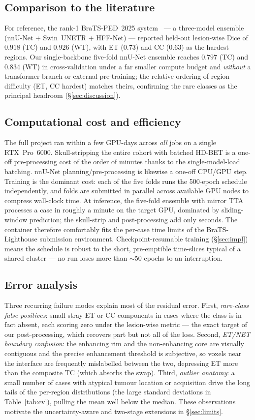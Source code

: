\documentclass[11pt,a4paper]{article}
\begin{document}
\subsection{Comparison to the literature}
For reference, the rank-1 BraTS-PED~2025 system~\cite{yi2025} --- a three-model
ensemble (nnU-Net + Swin~UNETR + HFF-Net) --- reported held-out lesion-wise Dice of
$0.918$ (TC) and $0.926$ (WT), with ET ($0.73$) and CC ($0.63$) as the hardest
regions. Our single-backbone five-fold nnU-Net ensemble reaches $0.797$ (TC) and
$0.834$ (WT) in cross-validation under a far smaller compute budget and \emph{without}
a transformer branch or external pre-training; the relative ordering of region
difficulty (ET, CC hardest) matches theirs, confirming the rare classes as the
principal headroom (\S\ref{sec:discussion}).

\subsection{Computational cost and efficiency}
The full project ran within a few GPU-days across \emph{all} jobs on a single
RTX~Pro~6000. Skull-stripping the entire cohort with batched HD-BET is a one-off
pre-processing cost of the order of minutes thanks to the single-model-load batching.
nnU-Net planning/pre-processing is likewise a one-off CPU/GPU step. Training is the
dominant cost: each of the five folds runs the 500-epoch schedule independently, and
folds are submitted in parallel across available GPU nodes to compress wall-clock
time. At inference, the five-fold ensemble with mirror TTA processes a case in
roughly a minute on the target GPU, dominated by sliding-window prediction; the
skull-strip and post-processing add only seconds. The container therefore comfortably
fits the per-case time limits of the BraTS-Lighthouse submission environment.
Checkpoint-resumable training (\S\ref{sec:impl}) means the schedule is robust to the
short, pre-emptible time-slices typical of a shared cluster --- no run loses more than
$\sim\!50$ epochs to an interruption.

\subsection{Error analysis}
Three recurring failure modes explain most of the residual error. First,
\emph{rare-class false positives}: small stray ET or CC components in cases where the
class is in fact absent, each scoring zero under the lesion-wise metric --- the exact
target of our post-processing, which recovers part but not all of the loss. Second,
\emph{ET/NET boundary confusion}: the enhancing rim and the non-enhancing core are
visually contiguous and the precise enhancement threshold is subjective, so voxels
near the interface are frequently mislabelled between the two, depressing ET more than
the composite TC (which absorbs the swap). Third, \emph{outlier anatomy}: a small
number of cases with atypical tumour location or acquisition drive the long tails of
the per-region distributions (the large standard deviations in Table~\ref{tab:cv}),
pulling the mean well below the median. These observations motivate the
uncertainty-aware and two-stage extensions in \S\ref{sec:limits}.
\end{document}
